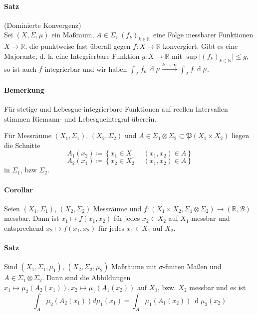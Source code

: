 \documentclass[12pt,a4paper,fleqn]{article}
\def\set#1{{\left\{ #1 \right\}}}
\def\Mid{\ \middle|\ }
\def\d{{\operatorname{d}}}
\begin{document}
\paragraph{Satz} (Dominierte Konvergenz)\\
Sei $(X, \Sigma, \mu)$ ein Maßraum, $A \in \Sigma$, $(f_k)_{k \in \mathbb{N}}$ eine Folge messbarer Funktionen $X \rightarrow \mathbb{R}$, die punktweise fast überall gegen $f\colon X \rightarrow \mathbb{R}$ konvergiert. Gibt es eine Majorante, d. h. eine Integrierbare Funktion $g\colon X \rightarrow \mathbb{R}$ mit $\sup \vert (f_k)_{k \in \mathbb{N}} \vert \leq g$, so ist auch $f$ integrierbar und wir haben $\int_A f_k\ \d\mu \xrightarrow{k \rightarrow \infty} \int_A f\ \d\mu$.

\paragraph{Bemerkung} Für stetige und Lebesgue-integrierbare Funktionen auf reellen Intervallen stimmen Riemann- und Lebesgueintegral überein.

Für Messräume $(X_1, \Sigma_1)$, $(X_2, \Sigma_2)$ und $A \in \Sigma_1 \otimes \Sigma_2 \subset \mathfrak{P}(X_1 \times X_2)$ liegen die Schnitte
\begin{displaymath}
A_1(x_2) \coloneqq \set{x_1 \in X_1 \Mid (x_1, x_2) \in A} 
\end{displaymath}
\begin{displaymath}
A_2(x_1) \coloneqq \set{x_2 \in X_2 \Mid (x_1, x_2) \in A} 
\end{displaymath}
in $\Sigma_1$, bzw $\Sigma_2$.

\paragraph{Corollar} Seien $(X_1, \Sigma_1)$, $(X_2, \Sigma_2)$ Messräume und ${f\colon (X_1 \times X_2, \Sigma_1 \otimes \Sigma_2) \rightarrow (\mathbb{R}, \mathcal{B})}$ messbar. Dann ist $x_1 \mapsto f(x_1, x_2)$ für jedes $x_2 \in X_2$ auf $X_1$ messbar und entsprechend $x_2 \mapsto f(x_1, x_2)$ für jedes $x_1 \in X_1$ auf $X_2$.

\paragraph{Satz} Sind $(X_1, \Sigma_1, \mu_1)$, $(X_2, \Sigma_2, \mu_2)$ Maßräume mit $\sigma$-finiten Maßen und ${A \in \Sigma_1 \otimes \Sigma_2}$. Dann sind die Abbildungen $x_1 \mapsto \mu_2(A_2(x_1)), x_2 \mapsto \mu_1(A_1(x_2))$ auf $X_1$, bzw. $X_2$ messbar und es ist
\begin{displaymath}
\int_A \mu_2(A_2(x_1)) d\mu_1(x_1) = \int_A \mu_1(A_1(x_2))\ \d\mu_2(x_2)
\end{displaymath}
\end{document}
